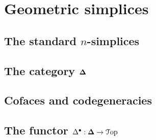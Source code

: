 \section{Geometric simplices}\label{sec2}

\subsection{The standard $n$-simplices}\label{sec2.1}

\subsection{The category $\boldsymbol{\Delta}$}\label{sec2.2}

\subsection{Cofaces and codegeneracies}\label{sec2.3}

\subsection{The functor $\Delta^\bullet : \boldsymbol{\Delta}\to\mathcal{T}\mathrm{op}$}\label{sec2.4}

